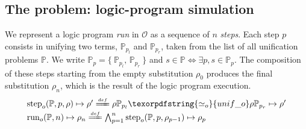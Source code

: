 \documentclass[sigconf,natbib=false,review]{acmart}
\newcommand{\UnifRel}{\ensuremath{\simeq}}
\newcommand{\Uo}{\texorpdfstring{\ensuremath{\UnifRel_o}\xspace}{unif\_o}}
\newcommand{\Ue}{\ensuremath{\UnifRel_m}\xspace}
\newcommand{\Fo}{\texorpdfstring{\ensuremath{\mathcal{O}}\xspace}{O}}
\newcommand{\foUnifPb}{\ensuremath{\mathbb{P}}\xspace}
\begin{document}
\subsection{The problem: logic-program simulation}
We represent a logic program \emph{run} in \Fo{} as
a sequence of $n$ \emph{steps}. Each step $p$ consists in
unifying two terms, $\foUnifPb_{p_l}$ and
$\foUnifPb_{p_r}$, taken from the list of all unification
problems \foUnifPb.
We write $\foUnifPb_p = \{~ \foUnifPb_{p_l},\, \foUnifPb_{p_r} ~\}$
and $s \in \foUnifPb \Leftrightarrow \exists p, s \in \foUnifPb_p$.
The composition of these steps starting from the
empty substitution $\rho_0$ produces the final
substitution $\rho_n$, which is the result of the
logic program execution.
%
\newcommand{\C}[4]{\ensuremath{\langle #1 \rangle}\mapsto(#2,#3,#4)}
\newcommand{\D}[4]{\ensuremath{\langle #1,#2,#3 \rangle^{-1}\mapsto #4}}
\newcommand{\progress}{\ensuremath{\mathrm{progress}}\xspace}
\newcommand{\fstep}{\ensuremath{{\mathrm{step}}_o}\xspace}
\newcommand{\hstep}{\ensuremath{{\mathrm{step}}_m}\xspace}
\newcommand{\frun}{\ensuremath{{\mathrm{run}}_o}\xspace}
\newcommand{\hrun}{\ensuremath{{\mathrm{run}}_m}\xspace}
\newcommand{\stepF}[4]{\ensuremath{\fstep(#1,#2,#3) \mapsto #4}}
\newcommand{\stepFD}[4]{%
\ensuremath{#3 #1_{#2_l} \Uo #3 #1_{#2_r} \mapsto #4}}
\newcommand{\stepH}[6]{\ensuremath{\hstep(#1,#2,#3,#4) \mapsto (#5, #6)}}
\newcommand{\stepHD}[6]{\ensuremath{%
#3 #1_{#2_l} \Ue #3 #1_{#2_r} \mapsto #4 \land \progress(#6,#4) \mapsto (#6',#5)}}
\newcommand{\runF}[3]{\ensuremath{\frun(#1,#2) \mapsto #3_{#2}}}
\newcommand{\runFx}[3]{\ensuremath{\frun(#1,#2) \mapsto #3}}
\newcommand{\runFD}[2]{\ensuremath{%
\bigwedge_{p = 1}^{#2} \stepF{#1}{p}{\rho_{p-1}}{\rho_{p}}}}
\newcommand{\runH}[3]{\ensuremath{\hrun(#1,#2) \mapsto #3_{#2}}}
\newcommand{\runHx}[3]{\ensuremath{\hrun(#1,#2) \mapsto #3}}
\newcommand{\runHD}[3]{\ensuremath{%
\bigwedge_{p = 1}^{#2} \stepH{#1}{p}{\sigma_{p-1}}{#3_{p-1}}{\sigma_{p}}{#3_p}}}
\newcommand{\deff}{\ensuremath{\stackrel{{\scriptscriptstyle def}}{=\!=\!\!\!=}}}
%
$$
\begin{array}{l}
\stepF{\foUnifPb}{p}{\rho}{\rho'}
\deff
\stepFD{\foUnifPb}{p}{\rho}{\rho'}\vspace{2pt}\\
\runF{\foUnifPb}{n}{\rho}
\deff
\runFD{\foUnifPb}{n}
\end{array}
$$
\end{document}
